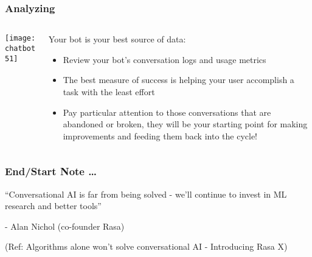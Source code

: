 \begin{frame}[fragile]\frametitle{Analyzing}
    \begin{columns}
    \begin{column}[t]{0.5\linewidth}
\begin{center}
\texttt{[image: chatbot51]}
\end{center}
\end{column}
    \begin{column}[t]{0.5\linewidth}
Your bot is your best source of data:

\begin{itemize}
\item Review your bot's conversation logs and usage metrics
\item The best measure of success is helping your user accomplish a task with the least effort
\item Pay particular attention to those conversations that are abandoned or broken, they will be your starting point for making improvements and feeding them back into the cycle!
\end{itemize}
\end{column}
\end{columns}
\end{frame}

\begin{frame}[fragile]\frametitle{End/Start Note \ldots}
``Conversational AI is far from being solved - we'll continue to invest in ML research and better tools''

- Alan Nichol (co-founder Rasa)

\tiny{(Ref: Algorithms alone won't solve conversational AI - Introducing Rasa X)}
\end{frame}